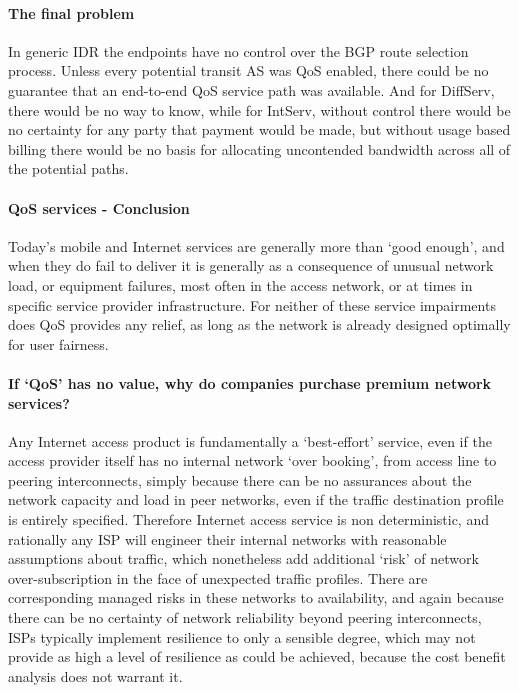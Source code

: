 \paragraph{The final problem}

In generic IDR the endpoints have no control over the BGP route selection process.
Unless every potential transit AS was QoS enabled, there could be no guarantee that an end-to-end QoS service path was available. And for DiffServ, there would be no way to know, while for IntServ, without control there would be no certainty for any party that payment would be made, but without usage based billing there would be no basis for allocating uncontended bandwidth across all of the potential paths.

\paragraph{QoS services - Conclusion}

Today's mobile and Internet services are generally more than ‘good enough’, and when they do fail to deliver it is generally as a consequence of unusual network load, or equipment failures, most often in the access network, or at times in specific service provider infrastructure.
For neither of these service impairments does QoS provides any relief, as long as the network is already designed optimally for user fairness.

\paragraph{If ‘QoS’ has no value, why do companies purchase premium network services?}

Any Internet access product is fundamentally a ‘best-effort’ service, even if the access provider itself has no internal network ‘over booking’, from access line to peering interconnects, simply because there can be no assurances about the network capacity and load in peer networks, even if the traffic destination profile is entirely specified.
Therefore Internet access service is non deterministic, and rationally any ISP will engineer their internal networks with reasonable assumptions about traffic, which nonetheless add additional ‘risk’ of network over-subscription in the face of unexpected traffic profiles.
There are corresponding managed risks in these networks to availability, and again because there can be no certainty of network reliability beyond peering interconnects, ISPs typically implement resilience to only a sensible degree, which may not provide as high a level of resilience as could be achieved, because the cost benefit analysis does not warrant it.

